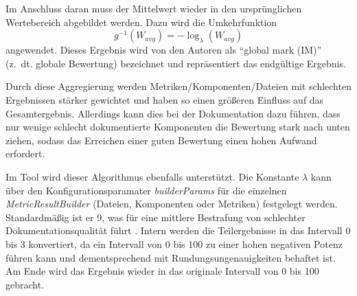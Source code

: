  Im Anschluss daran muss der Mittelwert wieder in den ursprünglichen Wertebereich abgebildet werden. Dazu wird die Umkehrfunktion
 \begin{equation}
     g^{-1}(W_{avg})=-\log_\lambda (W_{avg})
 \end{equation} angewendet. Dieses Ergebnis wird von den Autoren als \enquote{global mark (IM)} (z.~dt. globale Bewertung) bezeichnet und repräsentiert das endgültige Ergebnis.
 
 Durch diese Aggregierung werden Metriken/Komponenten/Dateien mit schlechten Ergebnissen stärker gewichtet und haben so einen größeren Einfluss auf das Gesamtergebnis. Allerdings kann dies bei der Dokumentation dazu führen, dass nur wenige schlecht dokumentierte Komponenten die Bewertung stark nach unten ziehen, sodass das Erreichen einer guten Bewertung einen hohen Aufwand erfordert. 
 
 Im Tool wird dieser Algorithmus ebenfalls unterstützt. Die Konstante $\lambda$ kann über den Konfigurationsparamater \textit{builderParams} für die einzelnen \textit{MetricResultBuilder} (Dateien, Komponenten oder Metriken) festgelegt werden. Standardmäßig ist er 9, was für eine mittlere Bestrafung von schlechter Dokumentationsqualität führt \cite[S. 1127]{Softwarequalitymetricsaggregationinindustry}. Intern werden die Teilergebnisse in das Intervall 0 bis 3 konvertiert, da ein Intervall von 0 bis 100 zu einer hohen negativen Potenz führen kann und dementsprechend mit Rundungsungenauigkeiten behaftet ist. Am Ende wird das Ergebnis wieder in das originale Intervall von 0 bis 100 gebracht. 
 
 
 

 
 